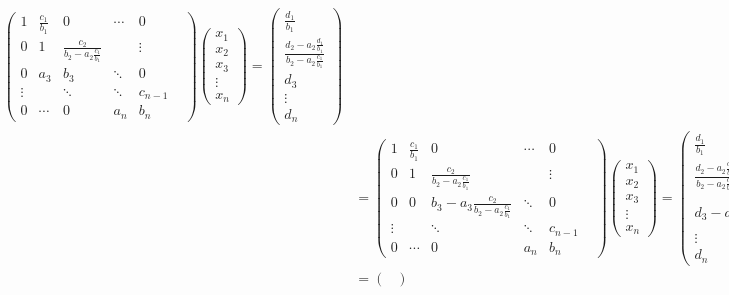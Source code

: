 \documentclass[12pt]{article}
\begin{document}
\begin{align*}
\begin{pmatrix}
        1 & \frac{c_1}{b_1} & 0 & \cdots & 0 \\
        0 & 1 & \frac{c_2}{b_2 - a_2\frac{c_1}{b_1}} & & \vdots \\
       0 & a_3 & b_3 & \ddots & 0 & \\
      \vdots & & \ddots & \ddots & c_{n-1} \\ 
      0 & \cdots & 0 & a_n & b_n
    \end{pmatrix}
    \begin{pmatrix}
      x_1 \\ x_2 \\ x_3 \\ \vdots \\ x_n 
    \end{pmatrix}
    = 
    \begin{pmatrix}
        \frac{d_1}{b_1} \\ \frac{d_2 - a_2\frac{d_1}{b_1}}{b_2 - a_2\frac{c_1}{b_1}} \\ d_3 \\ \vdots \\ d_n 
    \end{pmatrix} \\[10pt]
  &=\begin{pmatrix}
    1 & \frac{c_1}{b_1} & 0 & \cdots & 0 \\
    0 & 1 & \frac{c_2}{b_2 - a_2\frac{c_1}{b_1}} & & \vdots \\
   0 & 0 & b_3 - a_3\frac{c_2}{b_2 - a_2\frac{c_1}{b_1}} & \ddots & 0 & \\
  \vdots & & \ddots & \ddots & c_{n-1} \\ 
  0 & \cdots & 0 & a_n & b_n
\end{pmatrix}
\begin{pmatrix}
  x_1 \\ x_2 \\ x_3 \\ \vdots \\ x_n 
\end{pmatrix}
= 
\begin{pmatrix}
    \frac{d_1}{b_1} \\ \frac{d_2 - a_2\frac{d_1}{b_1}}{b_2 - a_2\frac{c_1}{b_1}} \\ d_3 - a_3\frac{d_2 - a_2\frac{d_1}{b_1}}{b_2 - a_2\frac{c_1}{b_1}} \\ \vdots \\ d_n 
\end{pmatrix} \\[10pt]
&=\begin{pmatrix}

\end{pmatrix}
\end{align*}
\end{document}
